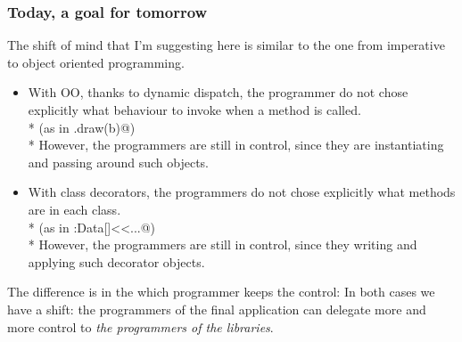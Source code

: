 \begin{frame}[fragile]
\frametitle{Today, a goal for tomorrow}
The shift of mind that I'm suggesting here is similar to the one from imperative to object oriented programming.
\begin{itemize}
\item With OO, thanks to dynamic dispatch, the programmer do not chose explicitly what behaviour to invoke when a method is called.\\*
(as in \Q@a.draw(b)@)\\*
However, the programmers are still in control, since they are instantiating and passing around such objects.
\PresentationOnly\pause\item With class decorators, the programmers do not chose explicitly what methods are in each class.\\*
(as in \Q@Person:Data[]<<...@)\\*
However, the programmers are still in control, since they writing and applying such decorator objects.
\end{itemize}\PresentationOnly\pause
The difference is in the which programmer keeps the control:
In both cases we have a shift: the programmers of the final application can delegate more and more control to \emph{the programmers of the libraries}.
\end{frame}

%
%
% 
%
%



